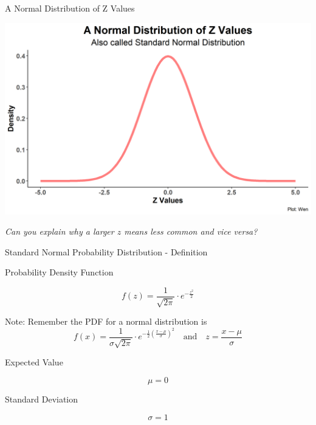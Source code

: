\documentclass{beamer}
\begin{document}
\begin{frame}{A Normal Distribution of Z Values}

\begin{center}
\includegraphics[scale=0.5]{images/standardNormal.png}
\end{center}

\textit{Can you explain why a larger $z$ means less common and vice versa? 
}
\end{frame}



\begin{frame}{Standard Normal Probability Distribution - Definition}

Probability Density Function 

$$f(z) = \frac{1}{\sqrt{2\pi}} \cdot e^{-\frac{z^2}{2}} $$

\begin{scriptsize}
Note: Remember the PDF for a normal distribution is 
$$ f(x) = \frac{1}{\sigma\sqrt{2\pi}} \cdot e^{-\frac{1}{2} \left(   \frac{x-\mu}{\sigma}\right)^2} \quad \text{and} \quad z = \frac{x-\mu}{\sigma}$$

\end{scriptsize}


Expected Value 

$$\mu = 0$$

Standard Deviation

$$\sigma = 1$$

\end{frame}
\end{document}
